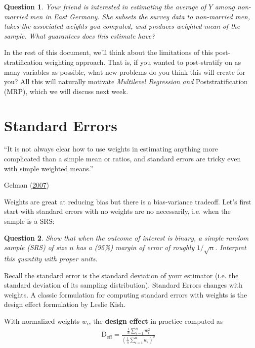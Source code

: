 \documentclass[10pt, letterpaper]{article}
\theoremstyle{mytheoremstyle}
\newtheorem{question}{Question}[section]
\begin{document}
\begin{question}
Your friend is interested in estimating the average of $Y$ among non-married men in East Germany. She subsets the survey data to non-married men, takes the associated weights you computed, and produces weighted mean of the sample. What guarantees does this estimate  have?
\end{question}

In the rest of this document, we'll think about the limitations of this post-stratification weighting approach. That is, if you wanted to post-stratify on as many variables as possible, what new problems do you think this will create for you? All this will naturally motivate \emph{Multilevel Regression and} Poststratification (MRP), which we will discuss next week.

\section{Standard Errors}

\epigraph{``It is not always clear how to use weights in estimating anything more complicated than a simple mean or ratios, and standard errors are tricky even with simple weighted means.''}{Gelman (\href{http://www.stat.columbia.edu/~gelman/research/published/STS226.pdf}{2007})}

Weights are great at reducing bias but there is a bias-variance tradeoff. Let's first start with standard errors with no weights are no necessarily, i.e. when the sample is a SRS:

\begin{question}
Show that when the outcome of interest is binary, a simple random sample (SRS) of size $n$ has a (95\%) margin of error of roughly $1/\sqrt{n}.$ Interpret this quantity with proper units.
\end{question}
\vspace{0.5in}

Recall the standard error is the standard deviation of your estimator (i.e. the standard deviation of its sampling distribution). Standard Errors changes with weights. A classic formulation for computing standard errors with weights is the design effect formulation by Leslie Kish. 

With normalized weights $w_i$, the \textbf{design effect} in practice computed as
\begin{align}
\text{D}_{\text{eff}} = \frac{\frac{1}{n}\sum^n_{i=1}w_i^2}{(\frac{1}{n}\sum^n_{i=1}w_i)^2}
\end{align}
\end{document}
